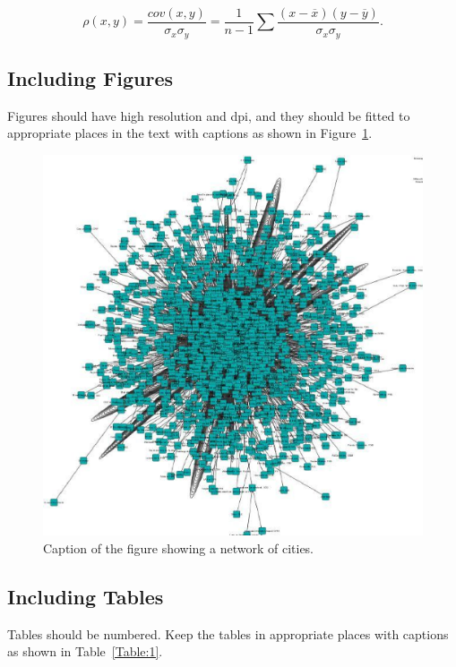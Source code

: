 \documentclass[12pt]{article}
\begin{document}
\begin{equation}\label{Equation:1}
\rho(x,y) = \frac{cov(x,y)}{\sigma_x\sigma_y} = \frac{1}{n-1}\sum\frac{(x-\overline{x})(y-\overline{y})}{\sigma_x\sigma_y}.
\end{equation}


\subsection{Including Figures}
Figures should have high resolution and dpi, and they should be fitted to appropriate places in the text with captions as shown in Figure~\ref{Figure:1}.

\begin{figure}[htp]
\centering
\includegraphics[scale=0.6]{Sample.eps}
\caption{Caption of the figure showing a network of cities.}
\label{Figure:1}
\end{figure}


\subsection{Including Tables}
Tables should be numbered. Keep the tables in appropriate places with captions as shown in Table~\ref{Table:1}.
\end{document}
